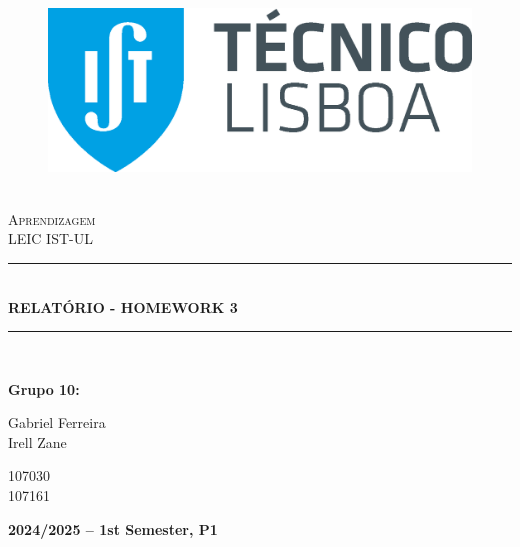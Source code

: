 \documentclass{article}
\newcommand{\HRule}[1]{\rule{\linewidth}{#1}}
\begin{document}
\begin{center}
  \begin{figure}
    \includegraphics[scale = 0.3, left]{img/IST_A.eps} %
    \end{figure}
  \LARGE{ \normalsize \textsc{} \\
  [2.0cm] 
  \LARGE{ \LARGE \textsc{Aprendizagem}} \\
  [1cm]
  \LARGE{ \LARGE \textsc{LEIC IST-UL}} \\
  [1cm]
  \HRule{1.5pt} \\
  [0.4cm]
  \LARGE \textbf{\uppercase{Relatório - Homework 3}}
  \HRule{1.5pt}
  \\ [2.5cm]
  }
\end{center}

\begin{flushleft}
  \textbf{\LARGE Grupo 10:}
\end{flushleft}

\begin{center}
  \begin{minipage}{0.7\textwidth}
      \begin{flushleft}
        \large Gabriel Ferreira \\
        \large  Irell Zane
      \end{flushleft}
  \end{minipage}%
  \begin{minipage}{0.3\textwidth}
      \begin{flushright}
        \large 107030\\
        \large 107161
      \end{flushright}
  \end{minipage}
\end{center}

\begin{center}
  \vspace{4cm}
  \date \large \bf  2024/2025 -- 1st Semester, P1
\end{center}
\end{document}
